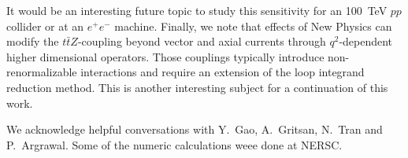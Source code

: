 \documentclass[preprint]{JHEP3}
\def\ttbZ{t\bar{t}Z}
\begin{document}
It would be an interesting future topic to study this sensitivity for an 100~TeV $pp$ collider or at an $e^+ e^-$ machine.
Finally, we note that effects of New Physics can modify the $\ttbZ$-coupling beyond vector and axial currents through $q^2$-dependent  higher dimensional operators. 
Those couplings typically introduce non-renormalizable interactions and require an extension of the loop integrand reduction method. 
This is another interesting subject for a continuation of this work.



\acknowledgments
We acknowledge helpful conversations with Y.~Gao, A.~Gritsan, N.~Tran and P.~Argrawal. 
Some of the numeric calculations weee done at NERSC.





\end{document}
